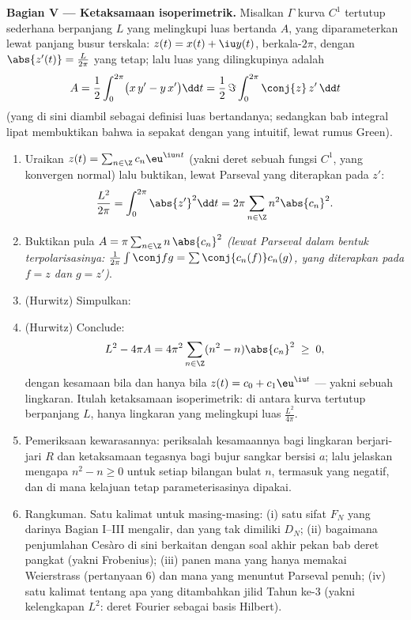 \begin{problem}
\medskip
\noindent\textbf{Bagian V --- Ketaksamaan isoperimetrik.} Misalkan
$\Gamma$ kurva $C^1$ tertutup sederhana berpanjang $L$ yang melingkupi
luas bertanda $A$, yang diparameterkan lewat panjang busur terskala: $z(t) =
x(t) + \iu y(t)$, berkala-$2\pi$, dengan $\abs{z'(t)} =
\frac{L}{2\pi}$ yang tetap; lalu luas yang dilingkupinya adalah
\[
A = \frac12\int_0^{2\pi}\bigl(x\,y' - y\,x'\bigr)\dd t
= \frac{1}{2}\,\Im\int_0^{2\pi}\conj{z}\,z'\,\dd t
\]
(yang di sini diambil sebagai definisi luas bertandanya; sedangkan bab
integral lipat membuktikan bahwa ia sepakat dengan yang intuitif,
lewat rumus Green).
\begin{enumerate}[resume]
  \item Uraikan $z(t) = \sum_{n\in\Z}c_n\eu^{\iu nt}$ (yakni
        deret sebuah fungsi $C^1$, yang konvergen normal) lalu
        buktikan, lewat Parseval yang diterapkan pada $z'$:
        \[
        \frac{L^2}{2\pi} = \int_0^{2\pi}\abs{z'}^2\dd t
        = 2\pi\sum_{n\in\Z}n^2\abs{c_n}^2 .
        \]
  \item Buktikan pula $A = \pi\sum_{n\in\Z}
        n\,\abs{c_n}^2$ \emph{(lewat Parseval dalam bentuk terpolarisasinya:
        $\frac{1}{2\pi}\int\conj f g = \sum
        \conj{c_n(f)}c_n(g)$, yang diterapkan pada $f = z$ dan $g = z'$)}.
  \item (Hurwitz) Simpulkan:
  \item (Hurwitz) Conclude:
        \[
        L^2 - 4\pi A = 4\pi^2\sum_{n\in\Z}
        (n^2 - n)\abs{c_n}^2 \;\geq\; 0 ,
        \]
        dengan kesamaan bila dan hanya bila $z(t) = c_0 +
        c_1\eu^{\iu t}$ --- yakni sebuah lingkaran. Itulah ketaksamaan
        isoperimetrik: di antara kurva tertutup berpanjang $L$, hanya
        lingkaran yang melingkupi luas $\frac{L^2}{4\pi}$.
  \item Pemeriksaan kewarasannya: periksalah kesamaannya bagi lingkaran
        berjari-jari $R$ dan ketaksamaan tegasnya bagi bujur sangkar
        bersisi $a$; lalu jelaskan mengapa $n^2 - n \geq 0$ untuk setiap
        bilangan bulat $n$, termasuk yang negatif, dan di mana
        kelajuan tetap parameterisasinya dipakai.
  \item Rangkuman. Satu kalimat untuk masing-masing: (i) satu
        sifat $F_N$ yang darinya Bagian I--III mengalir, dan
        yang tak dimiliki $D_N$; (ii) bagaimana penjumlahan Cesàro di sini
        berkaitan dengan soal akhir pekan bab deret pangkat
        (yakni Frobenius); (iii) panen mana yang hanya memakai
        Weierstrass (pertanyaan 6) dan mana yang menuntut
        Parseval penuh; (iv) satu kalimat tentang apa yang ditambahkan jilid
        Tahun ke-3 (yakni kelengkapan $L^2$: deret Fourier sebagai basis
        Hilbert).

\end{enumerate}
\end{problem}
